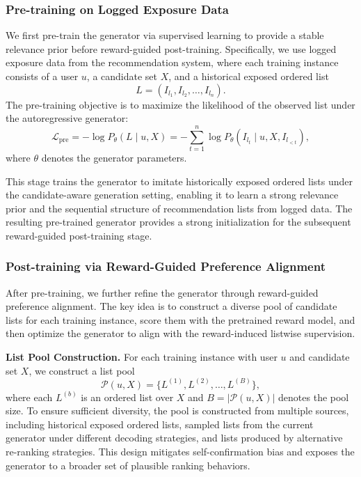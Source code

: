\documentclass[sigconf]{acmart}
\begin{document}
\subsubsection{Pre-training on Logged Exposure Data}
We first pre-train the generator via supervised learning to provide a stable relevance prior before reward-guided post-training. Specifically, we use logged exposure data from the recommendation system, where each training instance consists of a user $u$, a candidate set $X$, and a historical exposed ordered list
\[
L = (I_{l_1}, I_{l_2}, \dots, I_{l_n}).
\]
The pre-training objective is to maximize the likelihood of the observed list under the autoregressive generator:
\begin{equation}
\mathcal{L}_{\mathrm{pre}}
=
- \log P_\theta(L \mid u, X)
=
- \sum_{t=1}^{n}
\log P_\theta(I_{l_t} \mid u, X, I_{l_{<t}}),
\end{equation}
where $\theta$ denotes the generator parameters.

This stage trains the generator to imitate historically exposed ordered lists under the candidate-aware generation setting, enabling it to learn a strong relevance prior and the sequential structure of recommendation lists from logged data. The resulting pre-trained generator provides a strong initialization for the subsequent reward-guided post-training stage.

\subsubsection{Post-training via Reward-Guided Preference Alignment}
After pre-training, we further refine the generator through reward-guided preference alignment. The key idea is to construct a diverse pool of candidate lists for each training instance, score them with the pretrained reward model, and then optimize the generator to align with the reward-induced listwise supervision.

\vspace{0.5em}
\noindent\textbf{List Pool Construction.}
For each training instance with user $u$ and candidate set $X$, we construct a list pool
\[
\mathcal{P}(u, X) = \{L^{(1)}, L^{(2)}, \dots, L^{(B)}\},
\]
where each $L^{(b)}$ is an ordered list over $X$ and $B = |\mathcal{P}(u, X)|$
denotes the pool size. To ensure sufficient diversity, the pool is constructed
from multiple sources, including historical exposed ordered lists, sampled
lists from the current generator under different decoding strategies, and
lists produced by alternative re-ranking strategies. This design mitigates
self-confirmation bias and exposes the generator to a broader set of plausible
ranking behaviors.
\end{document}
